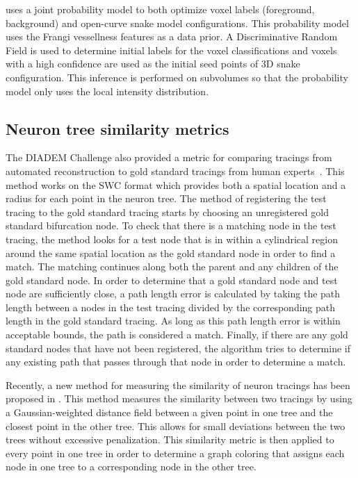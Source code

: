 \Textcite{Gulyanon2015}
 uses a joint probability model
to both optimize voxel labels (foreground,
background) and open-curve snake model
configurations. This probability model
uses the Frangi vessellness features as a
data prior. A Discriminative Random
Field is used to determine initial labels
for the voxel classifications and voxels
with a high confidence are used as the 
initial seed points of 3D snake configuration.
This inference is performed on subvolumes
so that the probability model only uses
the local intensity distribution.

\subsection{Neuron tree similarity metrics}

The DIADEM Challenge also provided a metric for comparing tracings
from automated reconstruction to gold standard tracings from human
experts~\autocite{DIADEM-metric-Gillette2011,Gillette2015}.
			This method works on the SWC
			format which provides both a spatial
			location and a radius for each point in the
			neuron tree. The method of registering the
			test tracing to the gold standard tracing
			starts by choosing an unregistered gold
			standard bifurcation node. To check that
			there is a matching node in the test
			tracing, the method looks for a test node
			that is in within a cylindrical region
			around the same spatial location as the
			gold standard node in order to find a
			match. The matching continues along both
			the parent and any children of the gold
			standard node. In order to determine that
			a gold standard node and test node are
			sufficiently close, a path length error is
			calculated by taking the path length
			between a nodes in the test tracing
			divided by the corresponding path length
			in the gold standard tracing. As long as
			this path length error is within
			acceptable bounds, the path is considered
			a match. Finally, if there are any gold
			standard nodes that have not been
			registered, the algorithm tries to
			determine if any existing path that passes
			through that node in order to determine a
			match.

Recently, a new method for measuring the similarity of neuron
tracings has been proposed in
\autocite{Mayerich2011,Mayerich2012}.
			This method
			measures the similarity between two
			tracings by using a Gaussian-weighted distance
			field between a given point in one tree
			and the closest point in the other
			tree. This allows for small deviations
			between the two trees without excessive
			penalization. This similarity metric is
			then applied to every point in one tree in order
			to determine a graph coloring that assigns
			each node in one tree to a corresponding
			node in the other tree.

